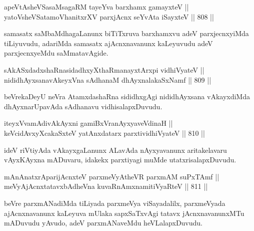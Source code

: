 \begin{shl}
apeVtAsheVSasaMsagaRM tayeYva barxhamx gamayxteV || \\
yatoV\s sheVSatamoVhanitxrXV parxjAcnx seYvAta iSayxteV \hfill || 808 ||  
\end{shl}

\begin{artha}
samasatx saMbaMdhagaLanunx biTiTxruva barxhamxvu adeV parxjecnxyiMda tiLiyuvudu, adariMda samasatx ajAcnxnavanunx kaLeyuvudu adeV parxjecnxyeMdu saMmatavAgide.
\end{artha}


\begin{shl}
sAkASxdadxshaRnasidadhxyXthaRmanayxtArxpi vidhiVyateV || \\
nididhAyxsanavAkeyxVna sAdhanaM dhAyxnalakaSxNamf \hfill || 809 ||  
\end{shl}

\begin{artha}
beVrekaDeyU neVra AtamxdashaRna sididhxgAgi nididhAyxsana vAkayxdiMda dhAyxnarUpavAda sAdhanavu vidhisalapxDuvudu.
\end{artha}

\begin{shl}
iteyxVvamAdivAkAyxni gamiBxVranAyxyaveVdinaH || \\
keVcidAvxyXcakaSxteV yatAnxdatarx parxtividhiVyateV \hfill || 810 ||  
\end{shl}

\begin{artha}
ideV riVtiyAda vAkayxgaLanunx ALavAda nAyxyavanunx aritakelavaru vAyxKAyxna mADuvaru, idakekx parxtiyagi muMde utatxrisalapxDuvudu.
\end{artha}


\begin{shl}
mAnAnatxrAparijAcnxteV parxmeVyAtheVR parxmAM suPxTAmf || \\
meVyAjAcnxtatavxbAdheVna kuvaRnAmxnamitiVyaRteV \hfill || 811 ||  
\end{shl}

\begin{artha}
beVre parxmANadiMda tiLiyada parxmeVya viSayadalilx, parxmeVyada ajAcnxnavanunx kaLeyuva mUlaka sapxSaTxvAgi tatavx jAcnxnavanunxMTu mADuvudu yAvudo, adeV parxmANaveMdu heVLalapxDuvudu.
\end{artha}


